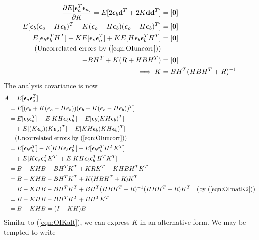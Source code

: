 \begin{align}
\frac{\partial E[\bm{\epsilon}_a^T\bm{\epsilon}_a]}{\partial K} = E[2\bm{\epsilon}_b\textbf{d}^T + 2K\textbf{d}\textbf{d}^T] &= [\textbf{0}] \nonumber \\
E[\bm{\epsilon}_b(\bm{\epsilon}_o -  H\bm{\epsilon}_b)^T + K(\bm{\epsilon}_o -  H\bm{\epsilon}_b)(\bm{\epsilon}_o -  H\bm{\epsilon}_b)^T] &= [\textbf{0}] \nonumber \\
E[\bm{\epsilon}_b\bm{\epsilon}_b^TH^T] + KE[\bm{\epsilon}_o\bm{\epsilon}_o^T] + KE[H\bm{\epsilon}_b\bm{\epsilon}_b^TH^T] &= [\textbf{0}] \nonumber \\ 
 \text{(Uncorrelated errors by (\ref{eqn:OIuncorr}))} & \nonumber \\
-BH^T + K(R+HBH^T) &= [\textbf{0}] \nonumber \\
\implies K &= BH^T(HBH^T+R)^{-1} \label{eqn:OImatK2}
\end{align}
The analysis covariance is now
\begin{align}
A &= E[\bm{\epsilon}_a\bm{\epsilon}_a^T] \nonumber \\
&= E[(\bm{\epsilon}_b + K(\bm{\epsilon}_o - H\bm{\epsilon}_b))(\bm{\epsilon}_b + K(\bm{\epsilon}_o - H\bm{\epsilon}_b))^T] \nonumber \\
&= E[\bm{\epsilon}_b\bm{\epsilon}_b^T] - E[KH\bm{\epsilon}_b\bm{\epsilon}_b^T] - E[\bm{\epsilon}_b(KH\bm{\epsilon}_b)^T] \nonumber \\
&\quad + E[(K\bm{\epsilon}_o)(K\bm{\epsilon}_o)^T] + E[KH\bm{\epsilon}_b(KH\bm{\epsilon}_b)^T] \nonumber \\
&\quad \text{(Uncorrelated errors by (\ref{eqn:OIuncorr}))} \nonumber \\
&= E[\bm{\epsilon}_b\bm{\epsilon}_b^T] - E[KH\bm{\epsilon}_b\bm{\epsilon}_b^T] - E[\bm{\epsilon}_b\bm{\epsilon}_b^TH^TK^T] \nonumber \\
&\quad + E[K\bm{\epsilon}_o\bm{\epsilon}_o^TK^T] + E[KH\bm{\epsilon}_b\bm{\epsilon}_b^TH^TK^T] \nonumber \\
&= B - KHB - BH^TK^T + KRK^T + KHBH^TK^T \nonumber \\
&= B - KHB - BH^TK^T + K(HBH^T+R)K^T \nonumber \\
&= B - KHB - BH^TK^T + BH^T(HBH^T+R)^{-1}(HBH^T+R)K^T &\text{(by (\ref{eqn:OImatK2}))} \nonumber \\
&= B - KHB - BH^TK^T + BH^TK^T \nonumber \\
&= B - KHB = (I-KH)B \label{eqn:OIcovA}
\end{align}
Similar to (\ref{eqn:OIKalt}), we can express $K$ in an alternative form. We may be tempted to write 
